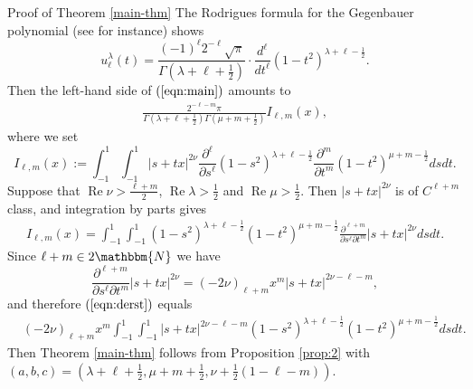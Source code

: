 \documentclass{article}
\numberwithin{equation}{section}
\newcommand{\assign}{:=}
\newcommand{\tmop}[1]{\ensuremath{\operatorname{#1}}}
\newenvironment{proof*}[1]{\noindent\textbf{#1\ }}{\hspace*{\fill}$\Box$\medskip}
\newcommand{\mygrammarfootnote}[1]{}
\begin{document}
\begin{proof*}{Proof of Theorem \ref{main-thm}}
  The Rodrigues formula for the Gegenbauer polynomial (see
  {\cite[(6.4.14)]{andrews2000special}} for instance) shows
  \begin{equation} u_{\ell}^{\lambda} (t) = \frac{(- 1)^{\ell} 2^{- \ell} \sqrt{\pi}}{\Gamma
     \left( \lambda + \ell + \frac{1}{2} \right)} \cdot \frac{d^{\ell}}{d
     t^{\ell}} (1 - t^2)^{\lambda + \ell - \frac{1}{2}} . 
     \label{eqn:Rod} \end{equation}
  Then\mygrammarfootnote{maybe, we need a comma here?} the left-hand side of
  $(\ref{eqn:main})$ amounts to
  \begin{eqnarray}
    & \frac{2^{- \ell - m} \pi}{\Gamma \left( \lambda + \ell + \frac{1}{2}
    \right) \Gamma \left( \mu + m + \frac{1}{2} \right)} I_{\ell, m} (x), & 
    \nonumber
  \end{eqnarray}
  where we set
  \[ I_{\ell, m} (x) \assign \displaystyle\int_{- 1}^1 \displaystyle\int_{- 1}^1 | s + tx |^{2 \nu}
     \frac{\partial^{\ell}}{\partial s^{\ell}} (1 - s^2)^{\lambda + \ell -
     \frac{1}{2}} \frac{\partial^m}{\partial t^m} (1 - t^2)^{\mu + m -
     \frac{1}{2}} d s d t. \]
  Suppose that $\tmop{Re} \nu > \frac{\ell + m}{2}$, $\tmop{Re} \lambda >
  \frac{1}{2}$ and $\tmop{Re} \mu > \frac{1}{2}$. Then $| s + tx |^{2 \nu}$ is
  of $C^{\ell + m}$ class, and integration by parts gives
  \begin{eqnarray}
    & I_{\ell, m} (x) = \displaystyle\int_{- 1}^1 \displaystyle\int_{- 1}^1 (1 - s^2)^{\lambda + \ell -
    \frac{1}{2}} (1 - t^2)^{\mu + m - \frac{1}{2}} \frac{\partial^{\ell +
    m}}{\partial s^{\ell} \partial t^m} | s + t x |^{2 \nu} d s d t. 
    \label{eqn:derst} & 
  \end{eqnarray}
  Since $\ell + m \in 2\mathbbm{N}$ we have
  \[ \frac{\partial^{\ell + m}}{\partial s^{\ell} \partial t^m} | s + tx |^{2
     \nu} = (- 2 \nu)_{\ell + m} x^m | s + t x |^{2 \nu - \ell - m}, \]
  and therefore $(\ref{eqn:derst})$ equals
  \begin{eqnarray}
    & (- 2 \nu)_{\ell + m} x^m \displaystyle\int_{- 1}^1 \displaystyle\int_{- 1}^1 | s + t x |^{2 \nu -
    \ell - m} (1 - s^2)^{\lambda + \ell - \frac{1}{2}} (1 - t^2)^{\mu + m -
    \frac{1}{2}} d s d t. &  \nonumber
  \end{eqnarray}
  Then Theorem \ref{main-thm} follows from Proposition \ref{prop:2} with $(a,
  b, c) = \left( \lambda + \ell + \frac{1}{2}, \mu + m + \frac{1}{2}, \nu +
  \frac{1}{2} (1 - \ell - m) \right)$.
\end{proof*}
\end{document}

